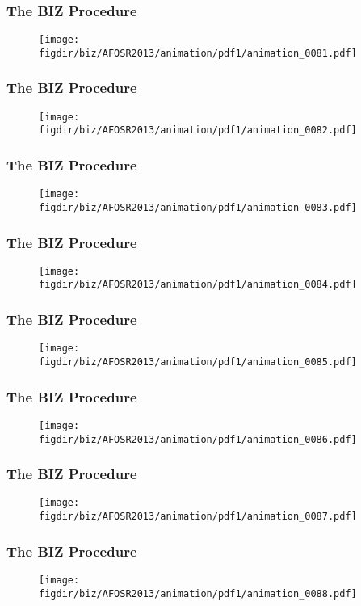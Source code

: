 \documentclass[13pt]{beamer}
\newcommand{\figdir}{../../fig}
\begin{document}
{\begin{frame}\frametitle{The BIZ Procedure}\begin{figure}\texttt{[image: \\figdir/biz/AFOSR2013/animation/pdf1/animation\_0081.pdf]}\end{figure}\end{frame}
\begin{frame}\frametitle{The BIZ Procedure}\begin{figure}\texttt{[image: \\figdir/biz/AFOSR2013/animation/pdf1/animation\_0082.pdf]}\end{figure}\end{frame}
\begin{frame}\frametitle{The BIZ Procedure}\begin{figure}\texttt{[image: \\figdir/biz/AFOSR2013/animation/pdf1/animation\_0083.pdf]}\end{figure}\end{frame}
\begin{frame}\frametitle{The BIZ Procedure}\begin{figure}\texttt{[image: \\figdir/biz/AFOSR2013/animation/pdf1/animation\_0084.pdf]}\end{figure}\end{frame}
\begin{frame}\frametitle{The BIZ Procedure}\begin{figure}\texttt{[image: \\figdir/biz/AFOSR2013/animation/pdf1/animation\_0085.pdf]}\end{figure}\end{frame}
\begin{frame}\frametitle{The BIZ Procedure}\begin{figure}\texttt{[image: \\figdir/biz/AFOSR2013/animation/pdf1/animation\_0086.pdf]}\end{figure}\end{frame}
\begin{frame}\frametitle{The BIZ Procedure}\begin{figure}\texttt{[image: \\figdir/biz/AFOSR2013/animation/pdf1/animation\_0087.pdf]}\end{figure}\end{frame}
\begin{frame}\frametitle{The BIZ Procedure}\begin{figure}\texttt{[image: \\figdir/biz/AFOSR2013/animation/pdf1/animation\_0088.pdf]}\end{figure}\end{frame}
}
\end{document}
